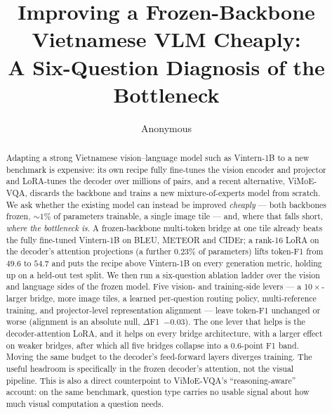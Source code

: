 \documentclass[runningheads]{llncs}
\newcommand{\dF}{\ensuremath{\Delta}F1\xspace}
\begin{document}
\title{Improving a Frozen-Backbone Vietnamese VLM Cheaply:\\
A Six-Question Diagnosis of the Bottleneck}

\author{Anonymous}

\maketitle

\begin{abstract}
Adapting a strong Vietnamese vision--language model such as Vintern-1B to a new
benchmark is expensive: its own recipe fully fine-tunes the vision encoder and
projector and LoRA-tunes the decoder over millions of pairs, and a recent
alternative, ViMoE-VQA, discards the backbone and trains a new mixture-of-experts
model from scratch. We ask whether the existing model can instead be improved
\emph{cheaply} --- both backbones frozen, ${\sim}1\%$ of parameters trainable, a
single image tile --- and, where that falls short, \emph{where the bottleneck
is}. A frozen-backbone multi-token bridge at one tile already beats the fully
fine-tuned Vintern-1B on BLEU, METEOR and CIDEr; a rank-16 LoRA on the decoder's
attention projections (a further $0.23\%$ of parameters) lifts token-F1 from
$49.6$ to $54.7$ and puts the recipe above Vintern-1B on every generation metric,
holding up on a held-out test split. We then run a six-question ablation ladder
over the vision and language sides of the frozen model. Five vision- and
training-side levers --- a $10\times$-larger bridge, more image tiles, a learned
per-question routing policy, multi-reference training, and projector-level
representation alignment --- leave token-F1 unchanged or worse (alignment is an
absolute null, \dF{}~$-0.03$). The one lever that helps is the decoder-attention
LoRA, and it helps on every bridge architecture, with a larger effect on weaker
bridges, after which all five bridges collapse into a $0.6$-point F1 band. Moving
the same budget to the decoder's feed-forward layers diverges training. The
useful headroom is specifically in the frozen decoder's attention, not the visual
pipeline. This is also a direct counterpoint to ViMoE-VQA's ``reasoning-aware''
account: on the same benchmark, question type carries no usable signal about how
much visual computation a question needs.

\end{abstract}













\end{document}
